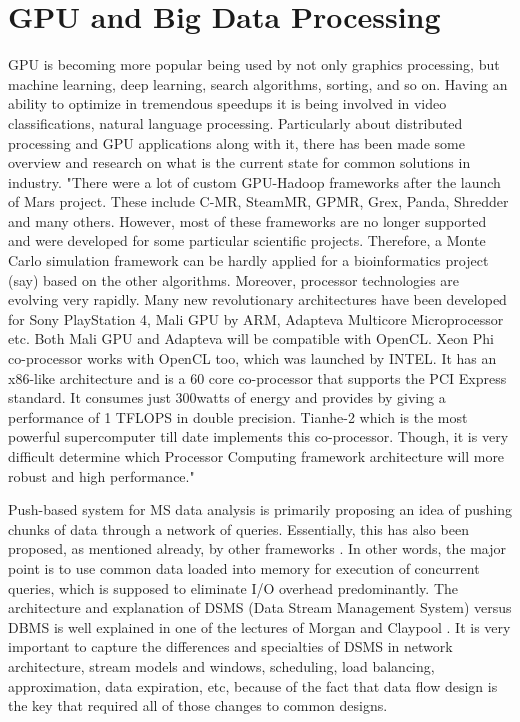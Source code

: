 \documentclass[11pt,a4paper]{report}
\begin{document}
\section{GPU and Big Data Processing}
GPU is becoming more popular being used by not only graphics processing, but machine learning, deep learning, search algorithms, sorting, and so on. Having an ability to optimize in tremendous speedups it is being involved in video classifications, natural language processing. Particularly about distributed processing and GPU applications along with it, there has been made some overview and research on what is the current state for common solutions in industry. "There were a lot of custom GPU-Hadoop frameworks after the launch of Mars project. These include C-MR, SteamMR, GPMR, Grex, Panda, Shredder and many others. However, most of these frameworks are no longer supported and were developed for some particular scientific projects. Therefore, a Monte Carlo simulation framework can be hardly applied for a bioinformatics project (say) based on the other algorithms. Moreover, processor technologies are evolving very rapidly. Many new revolutionary architectures have been developed for Sony PlayStation 4, Mali GPU by ARM, Adapteva Multicore Microprocessor etc. Both Mali GPU and Adapteva will be compatible with OpenCL. Xeon Phi co-processor works with OpenCL too, which was launched by INTEL. It has an x86-like architecture and is a 60 core co-processor that supports the PCI Express standard. It consumes just 300watts of energy and provides by giving a performance of 1 TFLOPS in double precision. Tianhe-2 which is the most powerful supercomputer till date implements this co-processor. Though, it is very difficult determine which Processor Computing framework architecture will more robust and high
performance." \cite{hadoopgpu}

Push-based system for MS data analysis is primarily proposing an idea of pushing chunks of data through a network of queries. Essentially, this has also been proposed, as mentioned already, by other frameworks \cite{DataPath,Volcano,Qpipe}. In other words, the major point is to use common data loaded into memory for execution of concurrent queries, which is supposed to eliminate I/O overhead predominantly. The architecture and explanation of DSMS (Data Stream Management System) versus DBMS is well explained in one of the lectures of Morgan and Claypool \cite{DataStreamManagement}. It is very important to capture the differences and specialties of DSMS in network architecture, stream models and windows, scheduling, load balancing, approximation, data expiration, etc, because of the fact that data flow design is the key that required all of those changes to common designs.
\end{document}

